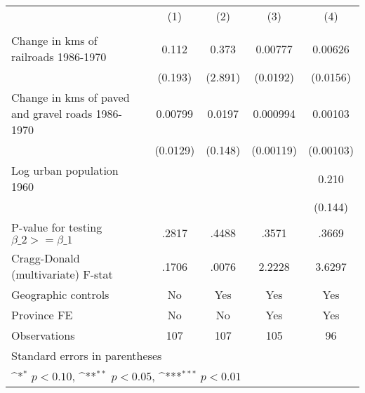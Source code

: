 {
\def\sym#1{\ifmmode^{#1}\else\(^{#1}\)\fi}
\begin{tabular}{l*{4}{c}}
\hline\hline
                &\multicolumn{1}{c}{(1)}&\multicolumn{1}{c}{(2)}&\multicolumn{1}{c}{(3)}&\multicolumn{1}{c}{(4)}\\
                &\multicolumn{1}{c}{}&\multicolumn{1}{c}{}&\multicolumn{1}{c}{}&\multicolumn{1}{c}{}\\
\hline
Change in kms of railroads 1986-1970&    0.112         &    0.373         &  0.00777         &  0.00626         \\
                &  (0.193)         &  (2.891)         & (0.0192)         & (0.0156)         \\
[1em]
Change in kms of paved and gravel roads 1986-1970&  0.00799         &   0.0197         & 0.000994         &  0.00103         \\
                & (0.0129)         &  (0.148)         &(0.00119)         &(0.00103)         \\
[1em]
Log urban population 1960&                  &                  &                  &    0.210         \\
                &                  &                  &                  &  (0.144)         \\
\hline
P-value for testing $\beta\_{2} >= \beta\_{1}$&    .2817         &    .4488         &    .3571         &    .3669         \\
Cragg-Donald (multivariate) F-stat&    .1706         &    .0076         &   2.2228         &   3.6297         \\
Geographic controls&       No         &      Yes         &      Yes         &      Yes         \\
Province FE     &       No         &       No         &      Yes         &      Yes         \\
Observations    &      107         &      107         &      105         &       96         \\
\hline\hline
\multicolumn{5}{l}{\footnotesize Standard errors in parentheses}\\
\multicolumn{5}{l}{\footnotesize \sym{*} \(p<0.10\), \sym{**} \(p<0.05\), \sym{***} \(p<0.01\)}\\
\end{tabular}
}
